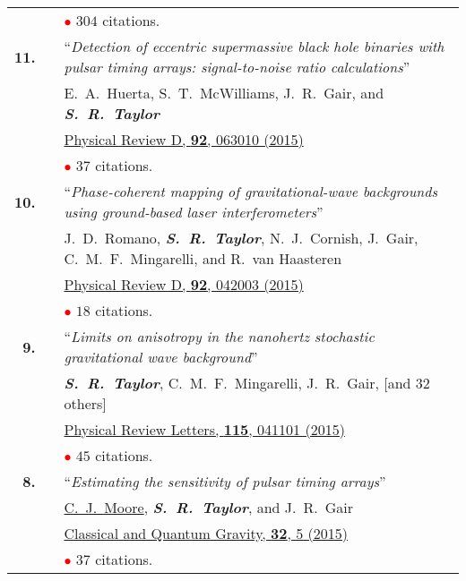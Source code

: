 \documentclass[11pt,letterpaper,sans]{moderncv}
\begin{document}
{\begin{longtable}{rp{0.3cm}p{15.8cm}}
&& \textcolor{red}{$\bullet$} $304$ citations. \vspace{0.09cm}\\
\textbf{11.} & & ``\textit{Detection of eccentric supermassive black hole binaries with pulsar timing arrays: signal-to-noise ratio calculations}'' \\ && E.~A.~Huerta, S.~T.~McWilliams, J.~R.~Gair, and \textit{\textbf{S.~R.~Taylor}} \\ 
&& \href{http://journals.aps.org/prd/abstract/10.1103/PhysRevD.92.063010}{{\color{color1} Physical Review D, \textbf{92}, 063010 (2015)}} \\
&& \textcolor{red}{$\bullet$} $37$ citations. \vspace{0.09cm}\\
\textbf{10.} & & ``\textit{Phase-coherent mapping of gravitational-wave backgrounds using ground-based laser interferometers}'' \\ 
&& J.~D.~Romano, \textit{\textbf{S.~R.~Taylor}}, N.~J.~Cornish, J.~Gair, C.~M.~F.~Mingarelli, and R.~van Haasteren \\ 
&& \href{http://journals.aps.org/prd/abstract/10.1103/PhysRevD.92.042003}{{\color{color1} Physical Review D, \textbf{92}, 042003 (2015)}} \\
&& \textcolor{red}{$\bullet$} $18$ citations. \vspace{0.09cm}\\
\textbf{9.} & & ``\textit{Limits on anisotropy in the nanohertz stochastic gravitational wave background}'' \\ 
&& \textit{\textbf{S.~R.~Taylor}}, C.~M.~F.~Mingarelli, J.~R.~Gair, [and 32 others] \\ 
&& \href{http://journals.aps.org/prl/abstract/10.1103/PhysRevLett.115.041101}{{\color{color1} Physical Review Letters, \textbf{115}, 041101 (2015)}} \\
&& \textcolor{red}{$\bullet$} $45$ citations. \vspace{0.09cm}\\
\textbf{8.} & & ``\textit{Estimating the sensitivity of pulsar timing arrays}'' \\ 
&& \underline{C.~J.~Moore}, \textit{\textbf{S.~R.~Taylor}}, and J.~R.~Gair \\ 
&& \href{http://iopscience.iop.org/article/10.1088/0264-9381/32/5/055004/meta}{{\color{color1} Classical and Quantum Gravity, \textbf{32}, 5 (2015)}} \\
&& \textcolor{red}{$\bullet$} $37$ citations. \vspace{0.09cm}\\

\end{longtable}}
\end{document}

